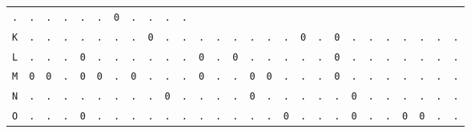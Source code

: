 \begin{figure}[H]
\begin{center}
{\begin{tabular}{c|cccccccccccccccccccccccccc}
        \texttt{.} & \texttt{.} & \texttt{.} & \texttt{.} &
        \texttt{.} & \texttt{.} & \texttt{0} & \texttt{.} &
        \texttt{.} & \texttt{.} & \texttt{.}                             \\
        \texttt{K} & \texttt{.} & \texttt{.} & \texttt{.} &
        \texttt{.} & \texttt{.} & \texttt{.} & \texttt{.} &
        \texttt{0} & \texttt{.} & \texttt{.} & \texttt{.} &
        \texttt{.} & \texttt{.} & \texttt{.} & \texttt{.} &
        \texttt{.} & \texttt{0} & \texttt{.} & \texttt{0} &
        \texttt{.} & \texttt{.} & \texttt{.} & \texttt{.} &
        \texttt{.} & \texttt{.} & \texttt{.}                             \\
        \texttt{L} & \texttt{.} & \texttt{.} & \texttt{.} &
        \texttt{0} & \texttt{.} & \texttt{.} & \texttt{.} &
        \texttt{.} & \texttt{.} & \texttt{.} & \texttt{0} &
        \texttt{.} & \texttt{0} & \texttt{.} & \texttt{.} &
        \texttt{.} & \texttt{.} & \texttt{.} & \texttt{0} &
        \texttt{.} & \texttt{.} & \texttt{.} & \texttt{.} &
        \texttt{.} & \texttt{.} & \texttt{.}                             \\
        \texttt{M} & \texttt{0} & \texttt{0} & \texttt{.} &
        \texttt{0} & \texttt{0} & \texttt{.} & \texttt{0} &
        \texttt{.} & \texttt{.} & \texttt{.} & \texttt{0} &
        \texttt{.} & \texttt{.} & \texttt{0} & \texttt{0} &
        \texttt{.} & \texttt{.} & \texttt{.} & \texttt{0} &
        \texttt{.} & \texttt{.} & \texttt{.} & \texttt{.} &
        \texttt{.} & \texttt{.} & \texttt{.}                             \\
        \texttt{N} & \texttt{.} & \texttt{.} & \texttt{.} &
        \texttt{.} & \texttt{.} & \texttt{.} & \texttt{.} &
        \texttt{.} & \texttt{0} & \texttt{.} & \texttt{.} &
        \texttt{.} & \texttt{.} & \texttt{0} & \texttt{.} &
        \texttt{.} & \texttt{.} & \texttt{.} & \texttt{.} &
        \texttt{0} & \texttt{.} & \texttt{.} & \texttt{.} &
        \texttt{.} & \texttt{.} & \texttt{.}                             \\
        \texttt{O} & \texttt{.} & \texttt{.} & \texttt{.} &
        \texttt{0} & \texttt{.} & \texttt{.} & \texttt{.} &
        \texttt{.} & \texttt{.} & \texttt{.} & \texttt{.} &
        \texttt{.} & \texttt{.} & \texttt{.} & \texttt{.} &
        \texttt{0} & \texttt{.} & \texttt{.} & \texttt{.} &
        \texttt{0} & \texttt{.} & \texttt{.} & \texttt{0} &
        \texttt{0} & \texttt{.} & \texttt{.}                             \\

\end{tabular}}
\end{center}
\end{figure}
